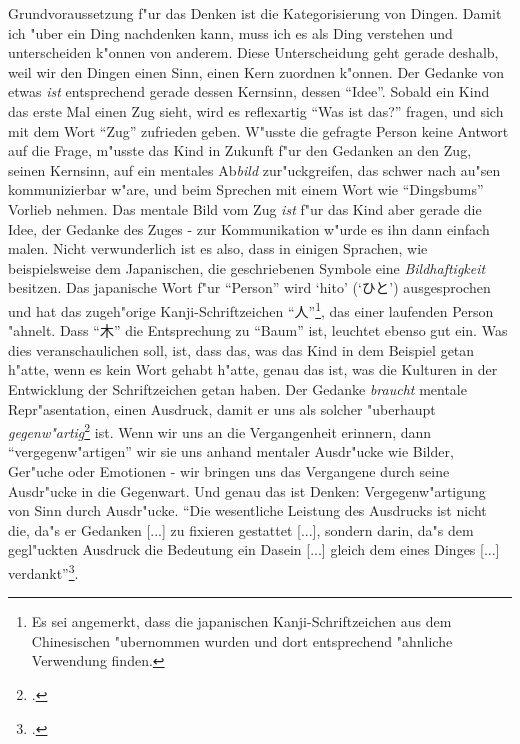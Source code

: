 \documentclass[a4paper, 12pt]{article}
\begin{document}
\begin{onehalfspace}
Grundvoraussetzung f"ur das Denken ist die Kategorisierung von Dingen. Damit ich "uber ein Ding nachdenken kann, muss ich es als Ding verstehen und unterscheiden k"onnen von anderem. Diese Unterscheidung geht gerade deshalb, weil wir den Dingen einen Sinn, einen Kern zuordnen k"onnen. Der Gedanke von etwas \emph{ist} entsprechend gerade dessen Kernsinn, dessen "`Idee"'. Sobald ein Kind das erste Mal einen Zug sieht, wird es reflexartig "`Was ist das?"' fragen, und sich mit dem Wort "`Zug"' zufrieden geben. W"usste die gefragte Person keine Antwort auf die Frage, m"usste das Kind in Zukunft f"ur den Gedanken an den Zug, seinen Kernsinn, auf ein mentales Ab\emph{bild} zur"uckgreifen, das schwer nach au"sen kommunizierbar w"are, und beim Sprechen mit einem Wort wie "`Dingsbums"' Vorlieb nehmen. Das mentale Bild vom Zug \emph{ist} f"ur das Kind aber gerade die Idee, der Gedanke des Zuges - zur Kommunikation w"urde es ihn dann einfach malen. Nicht verwunderlich ist es also, dass in einigen Sprachen, wie beispielsweise dem Japanischen, die geschriebenen Symbole eine \emph{Bildhaftigkeit} besitzen. Das japanische Wort f"ur "`Person"' wird `hito' (`ひと') ausgesprochen und hat das zugeh"orige Kanji-Schriftzeichen "`人"'\footnote{Es sei angemerkt, dass die japanischen Kanji-Schriftzeichen aus dem Chinesischen "ubernommen wurden und dort entsprechend "ahnliche Verwendung finden.}, das einer laufenden Person "ahnelt. Dass "`木"' die Entsprechung zu "`Baum"' ist, leuchtet ebenso gut ein. Was dies veranschaulichen soll, ist, dass das, was das Kind in dem Beispiel getan h"atte, wenn es kein Wort gehabt h"atte, genau das ist, was die Kulturen in der Entwicklung der Schriftzeichen getan haben. Der Gedanke \emph{braucht} mentale Repr"asentation, einen Ausdruck, damit er uns als solcher "uberhaupt \emph{gegenw"artig}\footnote{\cite[Vgl.][S. 215 f.]{merleau1966phanomenologie}.} ist. Wenn wir uns an die Vergangenheit erinnern, dann "`vergegenw"artigen"' wir sie uns anhand mentaler Ausdr"ucke wie Bilder, Ger"uche oder Emotionen - wir bringen uns das Vergangene durch seine Ausdr"ucke in die Gegenwart. Und genau das ist Denken: Vergegenw"artigung von Sinn durch Ausdr"ucke. "`Die wesentliche Leistung des Ausdrucks ist nicht die, da"s er Gedanken [...] zu fixieren gestattet [...], sondern darin, da"s dem gegl"uckten Ausdruck die Bedeutung ein Dasein [...] gleich dem eines Dinges [...] verdankt"'\footnote{\Cite[S. 216]{merleau1966phanomenologie}.}. 


\end{onehalfspace}
\end{document}
